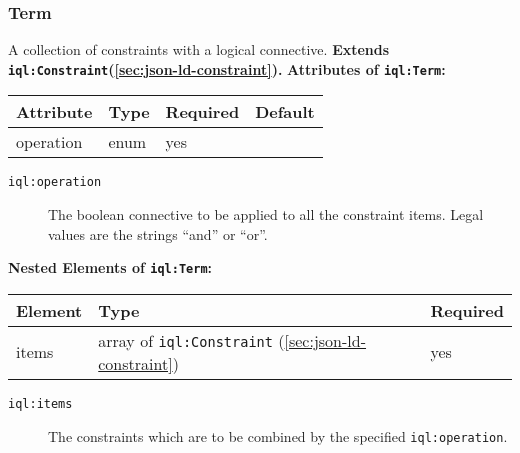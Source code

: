 \documentclass[11pt]{article}
\newcommand{\iqlns}{iql:}
\newcommand{\iqlType}[1]{\texttt{\iqlns#1}}
\newcommand{\attributes}[1]{\noindent\textbf{Attributes of \iqlType{#1}:}\newline\medskip}
\newcommand{\elements}[1]{\noindent\textbf{Nested Elements of \iqlType{#1}:}\newline\medskip}
\newcommand{\desc}[1]{\noindent#1\newline\medskip}
\newcommand{\extends}[2]{\noindent\textbf{Extends \iqlType{#1}(#2).}\newline\medskip}
\begin{document}
\subsubsection{Term}
\label{sec:json-ld-term}
\desc{A collection of constraints with a logical connective.}
\extends{Constraint}{\ref{sec:json-ld-constraint}}
\attributes{Term}
\begin{tabular}{|p{}|p{}|p{}|p{}|}
	\hline
	\textbf{Attribute} & \textbf{Type} & \textbf{Required} & \textbf{Default} \\ 
	\hline
	\hline
	operation & enum & yes &  \\ 
	\hline 
\end{tabular}
\begin{description}
	\item[\iqlType{operation}] The boolean connective to be applied to all the constraint items. Legal values are the strings ``and'' or ``or''.
\end{description}
\elements{Term}
\begin{tabular}{|p{}|p{}|p{}|}
	\hline
	\textbf{Element} & \textbf{Type} & \textbf{Required} \\ 
	\hline
	\hline 
	items & array of \iqlType{Constraint} (\ref{sec:json-ld-constraint}) & yes \\ 
	\hline 
\end{tabular}
\begin{description}
	\item[\iqlType{items}] The constraints which are to be combined by the specified \iqlType{operation}.
\end{description}
\end{document}
